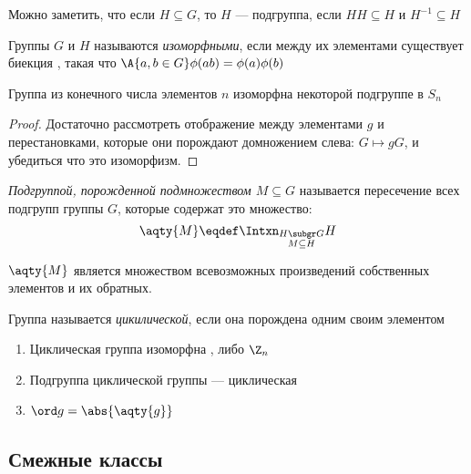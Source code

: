 Можно заметить, что если $H\subseteq G$, то $H$ --- подгруппа, если $HH\subseteq H$ и $H^{-1}\subseteq H$

\begin{definition}
  Группы $G$ и $H$ называются \emph{изоморфными}, если между их элементами существует биекция , такая что $\A{a,b \in G} \phi(ab)=\phi(a)\phi(b)$
\end{definition}

\begin{theorem}[Кэли]
  Группа из конечного числа элементов $n$ изоморфна некоторой подгруппе в $S_n$
\end{theorem}
\begin{proof}
  Достаточно рассмотреть отображение между элементами $g$ и перестановками, которые они порождают домножением слева: $G \mapsto gG$, и убедиться что это изоморфизм.
\end{proof}

\begin{definition}
  \emph{Подгруппой, порожденной подмножеством $M\subseteq G$} называется пересечение всех подгрупп группы $G$, которые содержат это множество:
  \[\aqty{M}\eqdef \Intxn_{\substack{H\subgr G \\ M\subseteq H}}H\]
\end{definition}

\begin{theorem}
  $\aqty{M}$ является множеством всевозможных произведений собственных элементов и их обратных.
\end{theorem}

\begin{definition}
  Группа называется \emph{цикилической}, если она порождена одним своим элементом
\end{definition}

\begin{theorem}
  \theoremlistshack
  \begin{enumerate}
    \item Циклическая группа изоморфна \Z, либо $\Z_n$
    \item Подгруппа циклической группы --- циклическая
    \item $\ord g = \abs{\aqty{g}}$
  \end{enumerate}
\end{theorem}



\subsection{Смежные классы}


